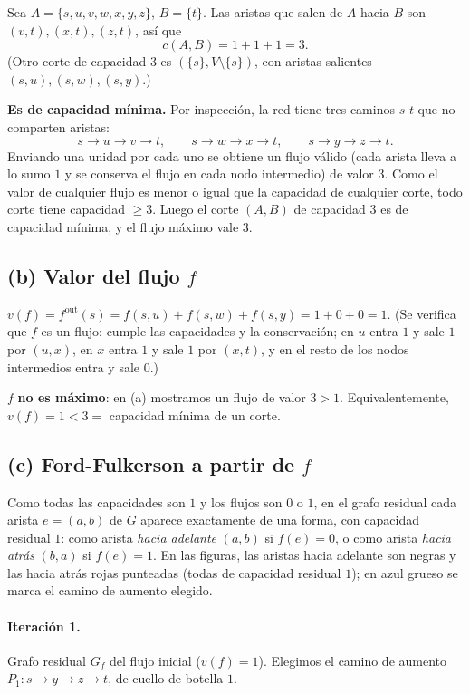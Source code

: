 Sea $A=\{s,u,v,w,x,y,z\}$, $B=\{t\}$. Las aristas que salen de $A$ hacia $B$ son $(v,t),(x,t),(z,t)$, así que
\[ c(A,B)=1+1+1=3. \]
(Otro corte de capacidad 3 es $(\{s\},V\setminus\{s\})$, con aristas salientes $(s,u),(s,w),(s,y)$.)

\textbf{Es de capacidad mínima.} Por inspección, la red tiene tres caminos $s$-$t$ que no comparten aristas:
\[ s\to u\to v\to t,\qquad s\to w\to x\to t,\qquad s\to y\to z\to t. \]
Enviando una unidad por cada uno se obtiene un flujo válido (cada arista lleva a lo sumo $1$ y se conserva el flujo en cada nodo intermedio) de valor $3$. Como el valor de cualquier flujo es menor o igual que la capacidad de cualquier corte, todo corte tiene capacidad $\ge 3$. Luego el corte $(A,B)$ de capacidad $3$ es de capacidad mínima, y el flujo máximo vale $3$.

\subsection*{(b) Valor del flujo $f$}

$v(f)=f^{\mathrm{out}}(s)=f(s,u)+f(s,w)+f(s,y)=1+0+0=1$. (Se verifica que $f$ es un flujo: cumple las capacidades y la conservación; en $u$ entra $1$ y sale $1$ por $(u,x)$, en $x$ entra $1$ y sale $1$ por $(x,t)$, y en el resto de los nodos intermedios entra y sale $0$.)

$f$ \textbf{no es máximo}: en (a) mostramos un flujo de valor $3>1$. Equivalentemente, $v(f)=1<3=$ capacidad mínima de un corte.

\subsection*{(c) Ford-Fulkerson a partir de $f$}

Como todas las capacidades son $1$ y los flujos son $0$ o $1$, en el grafo residual cada arista $e=(a,b)$ de $G$ aparece exactamente de una forma, con capacidad residual $1$: como arista \emph{hacia adelante} $(a,b)$ si $f(e)=0$, o como arista \emph{hacia atrás} $(b,a)$ si $f(e)=1$. En las figuras, las aristas hacia adelante son negras y las hacia atrás rojas punteadas (todas de capacidad residual $1$); en azul grueso se marca el camino de aumento elegido.

\paragraph{Iteración 1.} Grafo residual $G_f$ del flujo inicial ($v(f)=1$). Elegimos el camino de aumento $P_1: s\to y\to z\to t$, de cuello de botella $1$.

